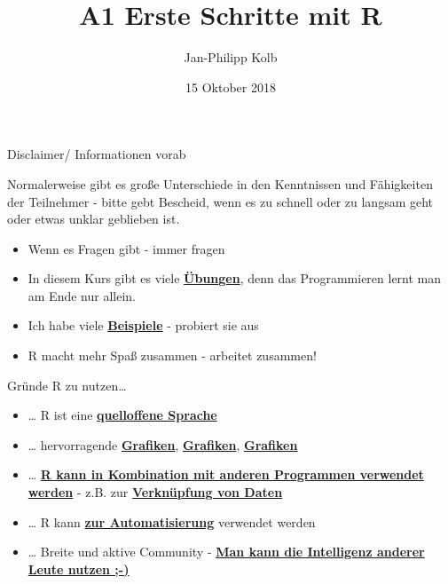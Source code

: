 \documentclass[ignorenonframetext,]{beamer}
\title{A1 Erste Schritte mit R}
\author{Jan-Philipp Kolb}
\date{15 Oktober 2018}
\providecommand{\tightlist}{%
  \setlength{\itemsep}{0pt}\setlength{\parskip}{0pt}}
\begin{document}
\frame{\titlepage}

\begin{frame}{Disclaimer/ Informationen vorab}

Normalerweise gibt es große Unterschiede in den Kenntnissen und
Fähigkeiten der Teilnehmer - bitte gebt Bescheid, wenn es zu schnell
oder zu langsam geht oder etwas unklar geblieben ist.

\begin{itemize}
\tightlist
\item
  Wenn es Fragen gibt - immer fragen
\item
  In diesem Kurs gibt es viele
  \href{http://web.math.ku.dk/~helle/R-intro/exercises.pdf}{\textbf{Übungen}},
  denn das Programmieren lernt man am Ende nur allein.
\item
  Ich habe viele \href{https://www.showmeshiny.com/}{\textbf{Beispiele}}
  - probiert sie aus
\item
  R macht mehr Spaß zusammen - arbeitet zusammen!
\end{itemize}

\end{frame}

\begin{frame}{Gründe R zu nutzen\ldots{}}

\begin{itemize}
\item
  \ldots{} R ist eine
  \href{https://stackoverflow.com/questions/1546583/what-is-the-definition-of-an-open-source-programming-language}{\textbf{quelloffene
  Sprache}}
\item
  \ldots{} hervorragende
  \href{http://matthewlincoln.net/2014/12/20/adjacency-matrix-plots-with-r-and-ggplot2.html}{\textbf{Grafiken}},
  \href{https://www.r-bloggers.com/3d-plots-with-ggplot2-and-plotly\%20/}{\textbf{Grafiken}},
  \href{https://procomun.wordpress.com/2011/03/18/splomr/}{\textbf{Grafiken}}
\item
  \ldots{} \href{https://github.com/Japhilko/RInterfaces}{\textbf{R kann
  in Kombination mit anderen Programmen verwendet werden}} - z.B. zur
  \href{https://github.com/Japhilko/RInterfaces/blob/master/slides/Datenimport.md}{\textbf{Verknüpfung
  von Daten}}
\item
  \ldots{} R kann
  \href{https://cran.r-project.org/web/packages/MplusAutomation/index.html}{\textbf{zur
  Automatisierung}} verwendet werden
\item
  \ldots{} Breite und aktive Community -
  \href{https://www.r-bloggers.com/}{\textbf{Man kann die Intelligenz
  anderer Leute nutzen ;-)}}
\end{itemize}

\end{frame}
\end{document}
